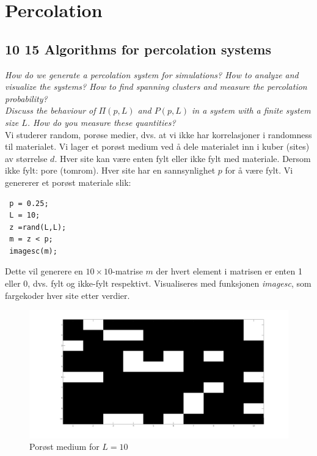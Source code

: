 \documentclass[english, a4paper]{article}
\begin{document}
\section{Percolation}

\subsection{10 15 Algorithms for percolation systems}
\textit{How do we generate a percolation system for simulations? How to analyze and visualize the systems?
How to find spanning clusters and measure the percolation probability?} \\
\textit{Discuss the behaviour of $\Pi(p,L)$ and $P(p,L)$ in a system with a finite system size $L$. 
How do you measure these quantities?}\\

\noindent
Vi studerer random, porøse medier, dvs. at vi ikke har korrelasjoner i randomness til materialet. 
Vi lager et porøst medium ved å dele materialet inn i kuber (sites) av størrelse $d$. Hver site 
kan være enten fylt eller ikke fylt med materiale. Dersom ikke fylt: pore (tomrom). Hver site
har en sannsynlighet $p$ for å være fylt. Vi genererer et porøst materiale slik:
\begin{lstlisting}
 p = 0.25;
 L = 10;
 z =rand(L,L);
 m = z < p;
 imagesc(m);
\end{lstlisting}
Dette vil generere en $10\times 10$-matrise $m$ der hvert element i matrisen er enten 1 eller 0, dvs. fylt og 
ikke-fylt respektivt. Visualiseres med funksjonen \textit{imagesc}, som fargekoder hver site etter verdier.
\begin{figure}[H]
  \begin{center}
  \includegraphics[width = 140mm]{../Figures/porousMedium10x10.png}
  \caption{Porøst medium for $L=10$}
  \label{fig:fig7}
  \end{center}
\end{figure}
\end{document}
